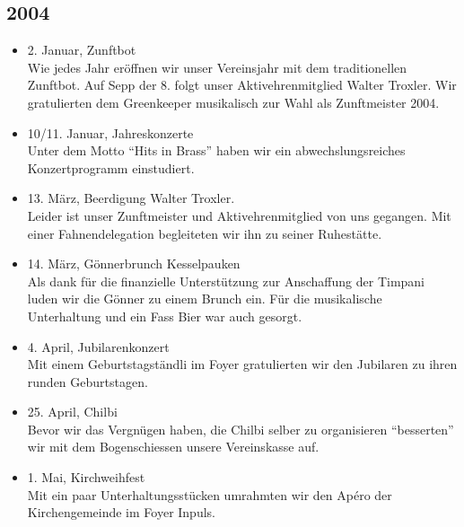 \subsection{2004}

\begin{history}


    \begin{itemize}

        \item 2. Januar, Zunftbot\\
              Wie jedes Jahr eröffnen wir unser Vereinsjahr mit dem traditionellen
              Zunftbot. Auf Sepp der 8. folgt unser Aktivehrenmitglied Walter Troxler.
              Wir gratulierten dem Greenkeeper musikalisch zur Wahl als Zunftmeister
              2004.

        \item 10/11. Januar, Jahreskonzerte\\
              Unter dem Motto \enquote{Hits in Brass} haben wir ein
              abwechslungsreiches Konzertprogramm einstudiert.

        \item 13. März, Beerdigung Walter Troxler.\\
              Leider ist unser Zunftmeister und Aktivehrenmitglied von uns gegangen.
              Mit einer Fahnendelegation begleiteten wir ihn zu seiner Ruhestätte.

        \item 14. März, Gönnerbrunch Kesselpauken\\
              Als dank für die finanzielle Unterstützung zur Anschaffung der Timpani
              luden wir die Gönner zu einem Brunch ein. Für die musikalische
              Unterhaltung und ein Fass Bier war auch gesorgt.

        \item 4. April, Jubilarenkonzert\\
              Mit einem Geburtstagständli im Foyer gratulierten wir den Jubilaren zu
              ihren runden Geburtstagen.

        \item 25. April, Chilbi\\
              Bevor wir das Vergnügen haben, die Chilbi selber zu organisieren
              \enquote{besserten} wir mit dem Bogenschiessen unsere Vereinskasse auf.

        \item 1. Mai, Kirchweihfest\\
              Mit ein paar Unterhaltungsstücken umrahmten wir den Apéro
              der Kirchengemeinde im Foyer Inpuls.


\end{itemize}
\end{history}
